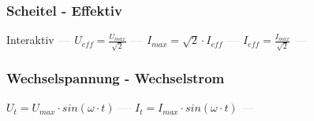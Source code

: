 \subsubsection{Scheitel - Effektiv} 
\begin{minipage}{0.45\textwidth} 
\end{minipage} 
\begin{minipage}{0.45\textwidth} 
 
\end{minipage} 
Interaktiv \textcolor{lightgray}{\textbf{---}} 
$ U_{eff}  = \frac{U_{max} }{\sqrt{2}} $ \textcolor{lightgray}{\textbf{---}} 
$ I_{max}  = \sqrt{2}\cdot I_{eff} $ \textcolor{lightgray}{\textbf{---}} 
$ I_{eff}  = \frac{I_{max} }{\sqrt{2}} $ \textcolor{lightgray}{\textbf{---}} 

\subsubsection{Wechselspannung - Wechselstrom} 
\begin{minipage}{0.45\textwidth} 
\end{minipage} 
\begin{minipage}{0.45\textwidth} 
 
\end{minipage} 
$ U_{t}  = U_{max} \cdot sin(\omega \cdot t) $ \textcolor{lightgray}{\textbf{---}} 
$ I_{t}  = I_{max} \cdot sin(\omega \cdot t) $ \textcolor{lightgray}{\textbf{---}} 

